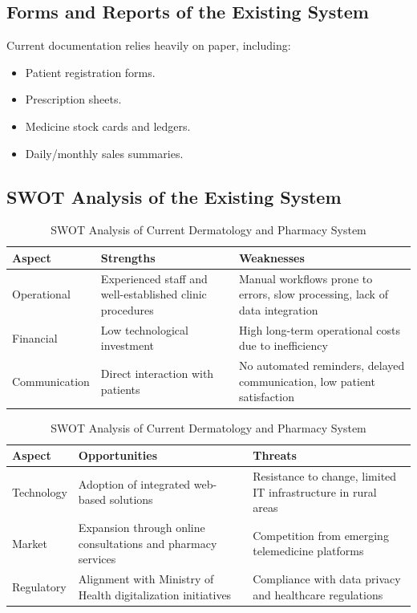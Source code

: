 \documentclass[12pt,a4paper]{report}
\begin{document}
\subsection{Forms and Reports of the Existing System}
Current documentation relies heavily on paper, including:
\begin{itemize}
    \item Patient registration forms.
    \item Prescription sheets.
    \item Medicine stock cards and ledgers.
    \item Daily/monthly sales summaries.
\end{itemize}

\subsection{SWOT Analysis of the Existing System}
\begin{table}[h]
\centering
\caption{SWOT Analysis of Current Dermatology and Pharmacy System}
\begin{tabular}{|l|p{6cm}|p{6cm}|}
\hline
\textbf{Aspect} & \textbf{Strengths} & \textbf{Weaknesses} \\ \hline
Operational & Experienced staff and well-established clinic procedures & Manual workflows prone to errors, slow processing, lack of data integration \\ \hline
Financial & Low technological investment & High long-term operational costs due to inefficiency \\ \hline
Communication & Direct interaction with patients & No automated reminders, delayed communication, low patient satisfaction \\ \hline
\end{tabular}

\vspace{0.5cm}

\begin{tabular}{|l|p{6cm}|p{6cm}|}
\hline
\textbf{Aspect} & \textbf{Opportunities} & \textbf{Threats} \\ \hline
Technology & Adoption of integrated web-based solutions & Resistance to change, limited IT infrastructure in rural areas \\ \hline
Market & Expansion through online consultations and pharmacy services & Competition from emerging telemedicine platforms \\ \hline
Regulatory & Alignment with Ministry of Health digitalization initiatives & Compliance with data privacy and healthcare regulations \\ \hline
\end{tabular}
\end{table}
\end{document}
